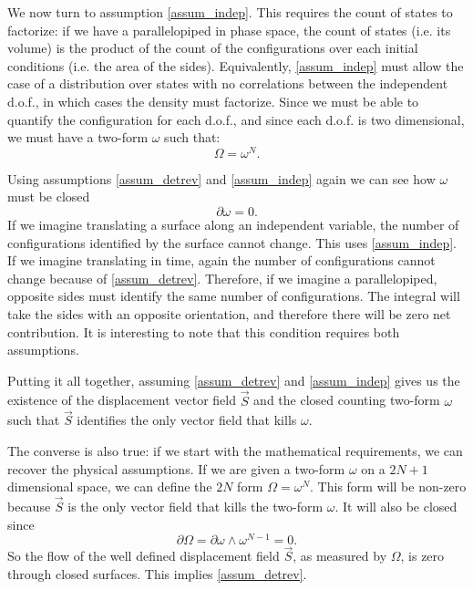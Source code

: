 \documentclass[10pt,twocolumn, nofootinbib]{revtex4-2}
\begin{document}
We now turn to assumption \ref{assum_indep}. This requires the count of states to factorize: if we have a parallelopiped in phase space, the count of states (i.e. its volume) is the product of the count of the configurations over each initial conditions (i.e. the area of the sides). Equivalently, \ref{assum_indep} must allow the case of a distribution over states with no correlations between the independent d.o.f., in which cases the density must factorize. Since we must be able to quantify the configuration for each d.o.f., and since each d.o.f. is two dimensional, we must have a two-form $\omega$ such that:
\begin{equation}
	\Omega = \omega^N.
\end{equation}

Using assumptions \ref{assum_detrev} and \ref{assum_indep} again we can see how $\omega$ must be closed
\begin{equation}
	\partial \omega = 0.
\end{equation}
If we imagine translating a surface along an independent variable, the number of configurations identified by the surface cannot change. This uses \ref{assum_indep}. If we imagine translating in time, again the number of configurations cannot change because of \ref{assum_detrev}. Therefore, if we imagine a parallelopiped, opposite sides must identify the same number of configurations. The integral will take the sides with an opposite orientation, and therefore there will be zero net contribution. It is interesting to note that this condition requires both assumptions.

Putting it all together, assuming \ref{assum_detrev} and \ref{assum_indep} gives us the existence of the displacement vector field $\vec{S}$ and the closed counting two-form $\omega$ such that $\vec{S}$ identifies the only vector field that kills $\omega$.

The converse is also true: if we start with the mathematical requirements, we can recover the physical assumptions. If we are given a two-form $\omega$ on a $2N+1$ dimensional space, we can define the $2N$ form $\Omega = \omega^N$. This form will be non-zero because $\vec{S}$ is the only vector field that kills the two-form $\omega$. It will also be closed since
\begin{equation}
	\partial \Omega = \partial \omega \wedge \omega^{N-1} = 0.
\end{equation}
So the flow of the well defined displacement field $\vec{S}$, as measured by $\Omega$, is zero through closed surfaces. This implies \ref{assum_detrev}.
\end{document}
